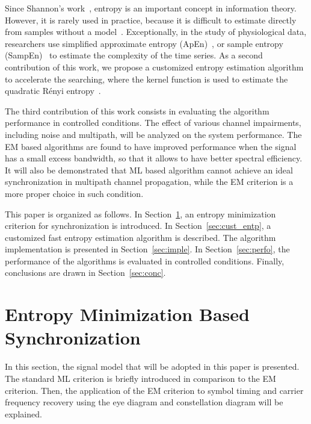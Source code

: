 \documentclass[journal,comsoc]{IEEEtran}
\begin{document}
Since Shannon's work~\cite{Shannon1948}, entropy is an important concept in information theory. 
However, it is rarely used in practice, because it is difficult to estimate directly from samples without a model~\cite{Bercher2000,Santamaria2002}.
Exceptionally, in the study of physiological data, researchers use simplified approximate entropy (ApEn)~\cite{Pincus1991}, or sample entropy (SampEn)~\cite{Richman2000} to estimate the complexity of the time series.
As a second contribution of this work, we propose a customized entropy estimation algorithm to accelerate the searching,
where the kernel function is used to estimate the quadratic R\'enyi entropy~\cite{Santamaria2002,Huang2008}.

The third contribution of this work consists in evaluating the algorithm performance in controlled conditions. 
The effect of various channel impairments, including noise and multipath, will be analyzed on the system performance.  
The EM based algorithms are found to have improved performance when the signal has a small excess bandwidth, so that it allows to have better spectral efficiency.
It will also be demonstrated that ML based algorithm cannot achieve an ideal synchronization in multipath channel propagation, while the EM criterion is a more proper choice in such condition. 



This paper is organized as follows.
In Section~\ref{sec:entropy},
an entropy minimization criterion for synchronization is introduced. 
In Section~\ref{sec:cust_entp}, a customized fast entropy estimation algorithm is described. 
The algorithm implementation is presented in Section~\ref{sec:imple}.
In Section~\ref{sec:perfo}, the performance of the algorithms is evaluated in controlled conditions.
Finally, conclusions are drawn in Section~\ref{sec:conc}.

\section{Entropy Minimization Based Synchronization}
\label{sec:entropy}
In this section, the signal model that will be adopted in this paper is presented.
The standard ML criterion is briefly introduced in comparison to the EM criterion.
Then, the application of the EM criterion to symbol timing and carrier frequency recovery using the eye diagram and constellation diagram will be explained.
\end{document}
